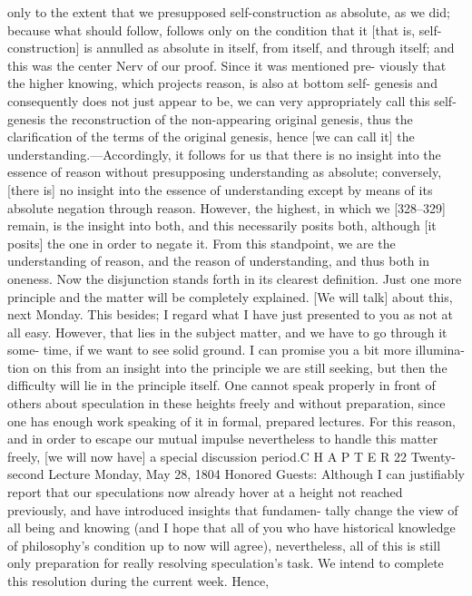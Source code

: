 only to the extent that we presupposed self-construction as absolute, as we
did; because what should follow, follows only on the condition that it [that is,
self-construction] is annulled as absolute in itself, from itself, and through
itself; and this was the center {Nerv} of our proof. Since it was mentioned pre-
viously that the higher knowing, which projects reason, is also at bottom self-
genesis and consequently does not just appear to be, we can very appropriately
call this self-genesis the reconstruction of the non-appearing original genesis,
thus the clarification of the terms of the original genesis, hence [we can call
it] the understanding.—Accordingly, it follows for us that there is no insight
into the essence of reason without presupposing understanding as absolute;
conversely, [there is] no insight into the essence of understanding except by
means of its absolute negation through reason. However, the highest, in which
we [328–329] remain, is the insight into both, and this necessarily posits both,
although [it posits] the one in order to negate it. From this standpoint, we are
the understanding of reason, and the reason of understanding, and thus both
in oneness. Now the disjunction stands forth in its clearest definition. Just one
more principle and the matter will be completely explained. [We will talk]
about this, next Monday.
This besides; I regard what I have just presented to you as not at all easy.
However, that lies in the subject matter, and we have to go through it some-
time, if we want to see solid ground. I can promise you a bit more illumina-
tion on this from an insight into the principle we are still seeking, but then the
difficulty will lie in the principle itself.
One cannot speak properly in front of others about speculation in these
heights freely and without preparation, since one has enough work speaking
of it in formal, prepared lectures. For this reason, and in order to escape our
mutual impulse nevertheless to handle this matter freely, [we will now have]
a special discussion period.C H A P T E R
22
Twenty-second Lecture
Monday, May 28, 1804
Honored Guests:
Although I can justifiably report that our speculations now already hover at a
height not reached previously, and have introduced insights that fundamen-
tally change the view of all being and knowing (and I hope that all of you who
have historical knowledge of philosophy’s condition up to now will agree),
nevertheless, all of this is still only preparation for really resolving speculation’s
task. We intend to complete this resolution during the current week. Hence,
